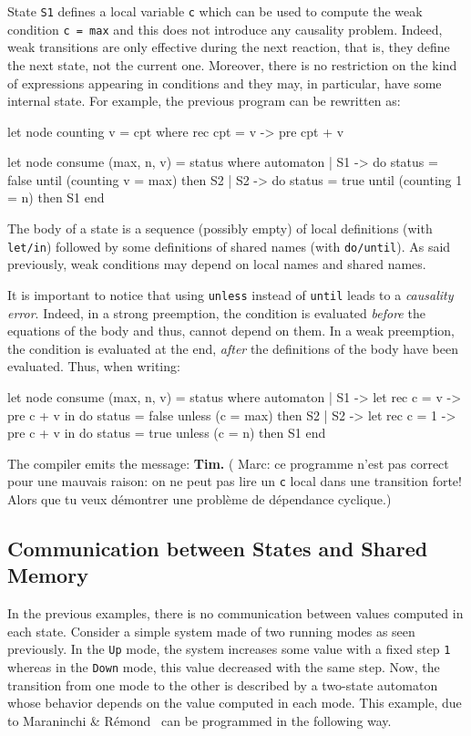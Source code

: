 \documentclass[11pt,titlepage,twoside]{report}
\newcommand{\Tim}[1]{{\bf Tim.} ({#1})}
\newenvironment{sample}
  {\begin{flushright}\begin{minipage}[t]{15cm}\begin{alltt}}
  {\end{alltt}\end{minipage}\end{flushright}}
\begin{document}
State \verb-S1- defines a local variable \verb-c- which can be used to
compute the weak condition \verb-c = max- and this does not introduce
any causality problem. Indeed, weak transitions are only effective
during the next reaction, that is, they define the next state, not the
current one. Moreover, there is no restriction on the kind of
expressions appearing in conditions and they may, in particular, have
some internal state. For example, the previous program can be
rewritten as:

\begin{runverbatim}
let node counting v = cpt where
  rec cpt = v -> pre cpt + v

let node consume (max, n, v) = status where
  automaton
  | S1 ->
       do status = false
       until (counting v = max) then S2
  | S2 ->
       do status = true
       until (counting 1 = n) then S1
  end
\end{runverbatim}
The body of a state is a sequence (possibly empty) of local
definitions (with \verb-let/in-) followed by some definitions of
shared names (with \verb-do/until-). As said previously, weak
conditions may depend on local names and shared names.

It is important to notice that using \verb-unless- instead of
\verb-until- leads to a {\em causality error}. Indeed, in a strong
preemption, the condition is evaluated {\em before} the equations of
the body and thus, cannot depend on them. In a weak preemption, the
condition is evaluated at the end, {\em after} the definitions of the
body have been evaluated. Thus, when writing:

\begin{runverbatim}[fail]
let node consume (max, n, v) = status where
  automaton
  | S1 ->
      let rec c = v -> pre c + v in
      do status = false
      unless (c = max) then S2
  | S2 ->
      let rec c = 1 -> pre c + v in
      do status = true
      unless (c = n) then S1
  end
\end{runverbatim}
The compiler emits the message:
\runverbatimerr{}
\Tim{ Marc: ce programme n'est pas correct pour une mauvais raison: on ne 
peut pas lire un \texttt{c} local dans une transition forte! Alors que tu 
veux démontrer une problème de dépendance cyclique.}

\subsection{Communication between States and Shared Memory}
In the previous examples, there is no communication between values
computed in each state. Consider a simple system made of two running
modes as seen previously. In the \verb-Up- mode, the system increases
some value with a fixed step \verb-1- whereas in the \verb-Down- mode,
this value decreased with the same step. Now, the transition from one
mode to the other is described by a two-state automaton whose behavior
depends on the value computed in each mode. This example, due to
Maraninchi \& R\'emond~\cite{Modes-SCP03} can be programmed in the
following way.
\end{document}
